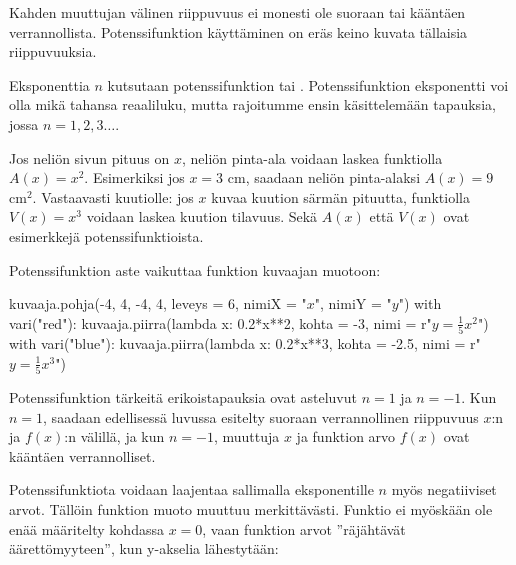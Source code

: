Kahden muuttujan välinen riippuvuus ei monesti ole suoraan tai kääntäen verrannollista. Potenssifunktion käyttäminen on eräs keino kuvata tällaisia riippuvuuksia.


Eksponenttia $n$ kutsutaan potenssifunktion  tai . Potenssifunktion eksponentti voi olla mikä tahansa reaaliluku, mutta rajoitumme ensin käsittelemään tapauksia, jossa $n = 1, 2, 3\ldots $.

\begin{esimerkki}
Jos neliön sivun pituus on $x$, neliön pinta-ala voidaan laskea funktiolla $A(x)=x^2$. Esimerkiksi jos $x = 3$ cm, saadaan neliön pinta-alaksi $A(x) = 9$ cm$^2$. Vastaavasti kuutiolle: jos $x$ kuvaa kuution särmän pituutta, funktiolla $V(x)=x^3$ voidaan laskea kuution tilavuus. Sekä $A(x)$ että $V(x)$ ovat esimerkkejä potenssifunktioista.
\end{esimerkki}

Potenssifunktion aste vaikuttaa funktion kuvaajan muotoon:

\begin{center}
\begin{kuva}
    kuvaaja.pohja(-4, 4, -4, 4, leveys = 6, nimiX = "$x$", nimiY = "$y$")
    with vari("red"): kuvaaja.piirra(lambda x: 0.2*x**2, kohta = -3, nimi = r"$y=\frac{1}{5}x^2$")
    with vari("blue"): kuvaaja.piirra(lambda x: 0.2*x**3, kohta = -2.5, nimi = r"$y=\frac{1}{5}x^3$")
\end{kuva}
\end{center}

Potenssifunktion tärkeitä erikoistapauksia ovat asteluvut $n = 1$ ja $n = -1$. Kun $n = 1$, saadaan edellisessä luvussa esitelty suoraan verrannollinen riippuvuus $x$:n ja $f(x)$:n välillä, ja kun $n = -1$, muuttuja $x$ ja funktion arvo $f(x)$ ovat kääntäen verrannolliset.

Potenssifunktiota voidaan laajentaa sallimalla eksponentille $n$ myös negatiiviset arvot. Tällöin funktion muoto muuttuu merkittävästi. Funktio ei myöskään ole enää määritelty kohdassa $x = 0$, vaan funktion arvot ''räjähtävät äärettömyyteen'', kun y-akselia lähestytään: %

